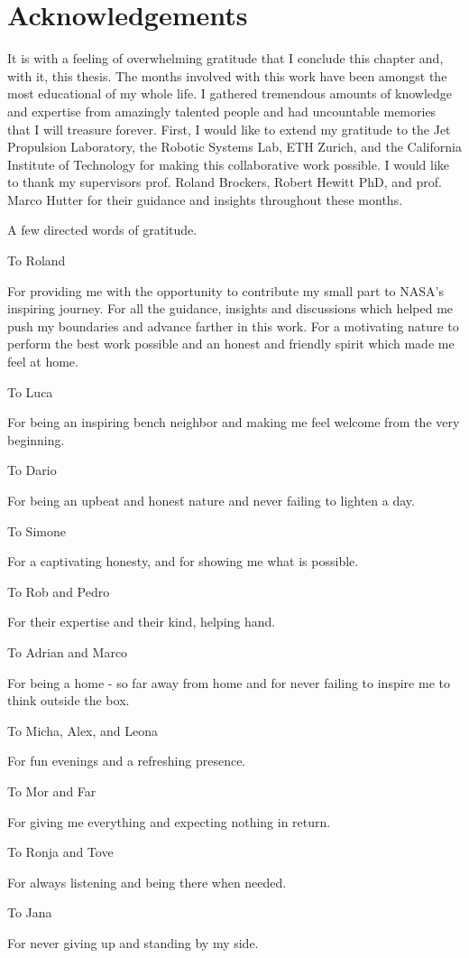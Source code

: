 \chapter*{Acknowledgements}

It is with a feeling of overwhelming gratitude that I conclude this chapter and, with it, this thesis. The months involved with this work have been amongst the most educational of my whole life. I gathered tremendous amounts of knowledge and expertise from amazingly talented people and had uncountable memories that I will treasure forever. First, I would like to extend my gratitude to the Jet Propulsion Laboratory, the Robotic Systems Lab, ETH Zurich, and the California Institute of Technology for making this collaborative work possible. I would like to thank my supervisors prof. Roland Brockers, Robert Hewitt PhD, and prof. Marco Hutter for their guidance and insights throughout these months.

A few directed words of gratitude.

To Roland

For providing me with the opportunity to contribute my small part to NASA's inspiring journey. For all the guidance, insights and discussions which helped me push my boundaries and advance farther in this work. For a motivating nature to perform the best work possible and an honest and friendly spirit which made me feel at home.

To Luca

For being an inspiring bench neighbor and making me feel welcome from the very beginning.

To Dario 

For being an upbeat and honest nature and never failing to lighten a day.

To Simone

For a captivating honesty, and for showing me what is possible. 

To Rob and Pedro

For their expertise and their kind, helping hand.

To Adrian and Marco

For being a home - so far away from home and for never failing to inspire me to think outside the box.

To Micha, Alex, and Leona

For fun evenings and a refreshing presence.

To Mor and Far 

For giving me everything and expecting nothing in return.

To Ronja and Tove

For always listening and being there when needed.

To Jana

For never giving up and standing by my side.